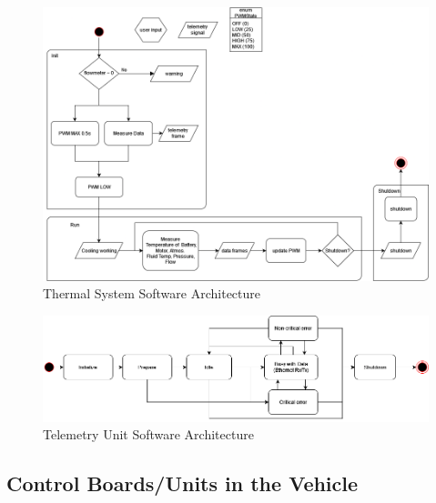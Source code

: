 \begin{figure}[H]
        \centering
       \includegraphics[width=\textwidth]{texfiles/elec/eimg/thermalsystemsflowchartsoftware}
        \caption{Thermal System Software Architecture}
        \label{fig:Thermal System Software Architecture}
    \end{figure}

\begin{figure}[H]
        \centering
       \includegraphics[width=\textwidth]{texfiles/elec/eimg/telemetrystate.png}
        \caption{Telemetry Unit Software Architecture}
        \label{fig:Telemetry Unit Software Architecture}
    \end{figure}

\subsection{Control Boards/Units in the Vehicle}

